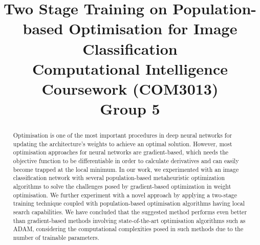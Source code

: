 \documentclass[conference]{IEEEtran}
\begin{document}
\title{Two Stage Training on Population-based Optimisation for Image Classification\\
{\footnotesize Computational Intelligence Coursework (COM3013)} \\
\vspace{-0.3em}
{\footnotesize  Group 5}
}

\author{
\and
{}
\and
{}
}

\maketitle

\begin{abstract}
Optimisation is one of the most important procedures in deep neural networks for updating the architecture's weights to achieve an optimal solution. However, most optimisation approaches for neural networks are gradient-based, which needs the objective function to be differentiable in order to calculate derivatives and can easily become trapped at the local minimum. In our work, we experimented with an image classification network with several population-based metaheuristic optimization algorithms to solve the challenges posed by gradient-based optimization in weight optimisation. We further experiment with a novel approach by applying a two-stage training technique coupled with population-based optimisation algorithms having local search capabilities. We have concluded that the suggested method performs even better than gradient-based methods involving state-of-the-art optimisation algorithms such as ADAM\cite{adam}, considering the computational complexities posed in such methods due to the number of trainable parameters.
\end{abstract}
\end{document}
